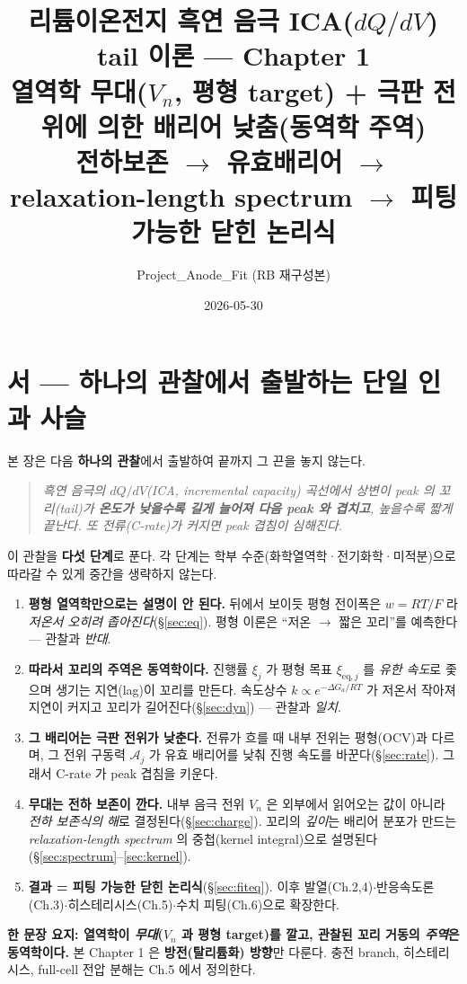 \documentclass[11pt,a4paper]{article}
\title{\textbf{리튬이온전지 흑연 음극 ICA($dQ/dV$) tail 이론 — Chapter 1}\\[0.4em]
\large 열역학 무대($V_n$, 평형 target) + 극판 전위에 의한 배리어 낮춤(동역학 주역)\\[0.2em]
\normalsize 전하보존 $\to$ 유효배리어 $\to$ relaxation-length spectrum $\to$ 피팅 가능한 닫힌 논리식}
\author{Project\_Anode\_Fit (RB 재구성본)}
\date{2026-05-30}
\newcommand{\eq}{\mathrm{eq}}
\begin{document}
\maketitle

\section*{서 — 하나의 관찰에서 출발하는 단일 인과 사슬}
본 장은 다음 \textbf{하나의 관찰}에서 출발하여 끝까지 그 끈을 놓지 않는다.
\begin{quote}\itshape
흑연 음극의 $dQ/dV$(ICA, incremental capacity) 곡선에서 상변이 peak 의 꼬리(tail)가 \textbf{온도가
낮을수록 길게 늘어져 다음 peak 와 겹치고}, 높을수록 짧게 끝난다. 또 전류(C-rate)가 커지면 peak 겹침이
심해진다.
\end{quote}
이 관찰을 \textbf{다섯 단계}로 푼다. 각 단계는 학부 수준(화학열역학·전기화학·미적분)으로 따라갈 수 있게
중간을 생략하지 않는다.
\begin{enumerate}[label=\textbf{(\arabic*)},leftmargin=2.2em]
\item \textbf{평형 열역학만으로는 설명이 안 된다.} 뒤에서 보이듯 평형 전이폭은 $w=RT/F$ 라 \emph{저온서
  오히려 좁아진다}(\S\ref{sec:eq}). 평형 이론은 ``저온 $\to$ 짧은 꼬리''를 예측한다 — 관찰과 \emph{반대}.
\item \textbf{따라서 꼬리의 주역은 동역학이다.} 진행률 $\xi_j$ 가 평형 목표 $\xi_{\eq,j}$ 를 \emph{유한
  속도}로 좇으며 생기는 지연(lag)이 꼬리를 만든다. 속도상수 $k\propto e^{-\Delta G_a/RT}$ 가 저온서
  작아져 지연이 커지고 꼬리가 길어진다(\S\ref{sec:dyn}) — 관찰과 \emph{일치}.
\item \textbf{그 배리어는 극판 전위가 낮춘다.} 전류가 흐를 때 내부 전위는 평형(OCV)과 다르며, 그 전위
  구동력 $\mathcal A_j$ 가 유효 배리어를 낮춰 진행 속도를 바꾼다(\S\ref{sec:rate}). 그래서 C-rate 가
  peak 겹침을 키운다.
\item \textbf{무대는 전하 보존이 깐다.} 내부 음극 전위 $V_n$ 은 외부에서 읽어오는 값이 아니라 \emph{전하
  보존식의 해}로 결정된다(\S\ref{sec:charge}). 꼬리의 \emph{깊이}는 배리어 분포가 만드는
  \emph{relaxation-length spectrum} 의 중첩(kernel integral)으로 설명된다(\S\ref{sec:spectrum}--\ref{sec:kernel}).
\item \textbf{결과 = 피팅 가능한 닫힌 논리식}(\S\ref{sec:fiteq}). 이후 발열(Ch.2,4)$\cdot$반응속도론
  (Ch.3)$\cdot$히스테리시스(Ch.5)$\cdot$수치 피팅(Ch.6)으로 확장한다.
\end{enumerate}
\noindent\textbf{한 문장 요지: 열역학이 \emph{무대}($V_n$ 과 평형 target)를 깔고, 관찰된 꼬리 거동의
\emph{주역}은 동역학이다.} 본 Chapter 1 은 \textbf{방전(탈리튬화) 방향}만 다룬다. 충전 branch,
히스테리시스, full-cell 전압 분해는 Ch.5 에서 정의한다.
\end{document}
